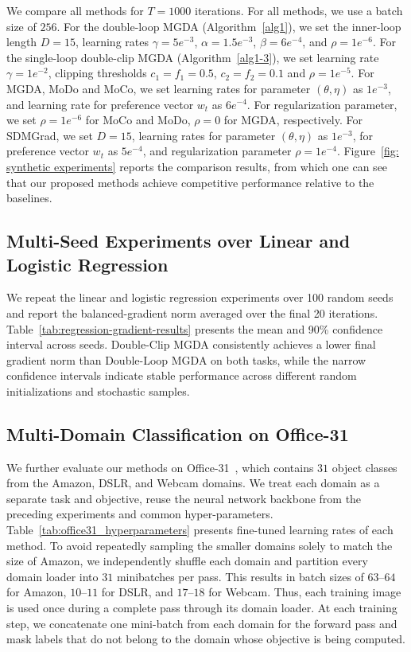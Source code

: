 \documentclass[twoside]{article} %
\theoremstyle{plain}
\theoremstyle{definition}
\theoremstyle{remark}
\begin{document}
We compare all methods for $T={1000}$ iterations. For all methods, we use a batch size of $256$. For the double-loop MGDA (Algorithm~\ref{alg1}), we set the inner-loop length $D=15$, learning rates $\gamma=5e^{-3}$, $\alpha=1.5e^{-3}$, $\beta = 6e^{-4}$, and $\rho=1e^{-6}$. For the single-loop double-clip MGDA (Algorithm~\ref{alg1-3}), we set learning rate $\gamma = 1e^{-2}$, clipping thresholds $c_1=f_1=0.5$, $c_2=f_2=0.1$ and $\rho=1e^{-5}$. For MGDA, MoDo and MoCo, we set learning rates for parameter $(\theta,\eta)$ as $1e^{-3}$, and learning rate for preference vector $w_t$ as $6e^{-4}$. For regularization parameter, we set $\rho=1e^{-6}$ for MoCo and MoDo, $\rho=0$ for MGDA, respectively. For SDMGrad, we set $D=15$, learning rates for parameter $(\theta,\eta)$ as $1e^{-3}$, for preference vector $w_t$ as $5e^{-4}$, and regularization parameter $\rho=1e^{-4}$.  Figure~\ref{fig: synthetic experiments} reports the comparison results, from which one can see that our proposed methods
achieve competitive performance relative to the baselines.
\subsection{Multi-Seed Experiments over Linear and Logistic Regression}
We repeat the linear and logistic regression experiments over 100 random seeds and report the balanced-gradient norm averaged over the final 20 iterations. Table~\ref{tab:regression-gradient-results} presents the mean and 90\% confidence interval across seeds. Double-Clip MGDA consistently achieves a lower final gradient norm than Double-Loop MGDA on both tasks, while the narrow confidence intervals indicate stable performance across different random initializations and stochastic samples.
\subsection{Multi-Domain Classification on Office-31}\label{Appendix: office-31 dataset experiment}
We further evaluate our methods on Office-31~\citep{officedata31}, which contains $31$ object classes from the Amazon, DSLR, and Webcam domains.  We treat each domain as a separate task and objective, reuse the neural network backbone from the preceding experiments and common hyper-parameters. Table~\ref{tab:office31_hyperparameters} presents fine-tuned learning rates of each method. To avoid repeatedly sampling the smaller domains solely to match the size of Amazon, we independently shuffle each domain and partition every domain loader into $31$ minibatches per pass. This results in batch sizes of $63$--$64$ for Amazon, $10$--$11$ for DSLR, and $17$--$18$ for Webcam. Thus, each training image is used once during a complete pass through its domain loader. At each training step, we concatenate one mini-batch from each domain for the forward pass and mask labels that do not belong to the domain whose objective is being computed.
\end{document}
